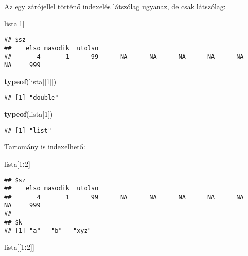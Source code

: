 \documentclass[
]{book}
\newenvironment{Shaded}{\begin{snugshade}}{\end{snugshade}}
\newcommand{\DecValTok}[1]{\textcolor[rgb]{0.00,0.00,0.81}{#1}}
\newcommand{\KeywordTok}[1]{\textcolor[rgb]{0.13,0.29,0.53}{\textbf{#1}}}
\newcommand{\NormalTok}[1]{#1}
\newcommand{\OperatorTok}[1]{\textcolor[rgb]{0.81,0.36,0.00}{\textbf{#1}}}
\begin{document}
Az egy zárójellel történő indexelés látszólag ugyanaz, de csak látszólag:

\begin{Shaded}
\begin{Highlighting}[]
\NormalTok{lista[}\DecValTok{1}\NormalTok{]}
\end{Highlighting}
\end{Shaded}

\begin{verbatim}
## $sz
##    elso masodik  utolso                                                         
##       4       1      99      NA      NA      NA      NA      NA      NA     999
\end{verbatim}

\begin{Shaded}
\begin{Highlighting}[]
\KeywordTok{typeof}\NormalTok{(lista[[}\DecValTok{1}\NormalTok{]])}
\end{Highlighting}
\end{Shaded}

\begin{verbatim}
## [1] "double"
\end{verbatim}

\begin{Shaded}
\begin{Highlighting}[]
\KeywordTok{typeof}\NormalTok{(lista[}\DecValTok{1}\NormalTok{])}
\end{Highlighting}
\end{Shaded}

\begin{verbatim}
## [1] "list"
\end{verbatim}

Tartomány is indexelhető:

\begin{Shaded}
\begin{Highlighting}[]
\NormalTok{lista[}\DecValTok{1}\OperatorTok{:}\DecValTok{2}\NormalTok{]}
\end{Highlighting}
\end{Shaded}

\begin{verbatim}
## $sz
##    elso masodik  utolso                                                         
##       4       1      99      NA      NA      NA      NA      NA      NA     999 
## 
## $k
## [1] "a"   "b"   "xyz"
\end{verbatim}

\begin{Shaded}
\begin{Highlighting}[]
\NormalTok{lista[[}\DecValTok{1}\OperatorTok{:}\DecValTok{2}\NormalTok{]]}
\end{Highlighting}
\end{Shaded}
\end{document}
